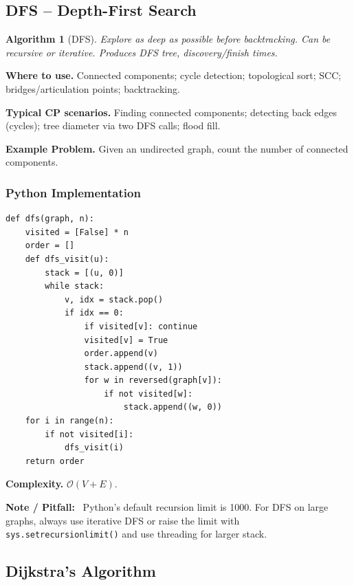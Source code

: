 \documentclass[10pt,a4paper]{article}
\theoremstyle{cpstyle}
\newtheorem{algorithm}[theorem]{Algorithm}
\newenvironment{cpnote}{%
  \begin{mdframed}[backgroundcolor=notebg, linecolor=orange!70, linewidth=1pt,
    innerleftmargin=10pt, innerrightmargin=10pt, innertopmargin=6pt, innerbottommargin=6pt]
  \textbf{\color{orange!80!black}Note / Pitfall:}~}{%
  \end{mdframed}}
\newcommand{\bigO}[1]{\mathcal{O}\!\left(#1\right)}
\begin{document}
\subsection{DFS -- Depth-First Search}

\begin{algorithm}[DFS]
Explore as deep as possible before backtracking. Can be recursive or iterative. Produces DFS tree, discovery/finish times.
\end{algorithm}

\textbf{Where to use.} Connected components; cycle detection; topological sort; SCC; bridges/articulation points; backtracking.

\textbf{Typical CP scenarios.} Finding connected components; detecting back edges (cycles); tree diameter via two DFS calls; flood fill.

\textbf{Example Problem.} Given an undirected graph, count the number of connected components.

\subsubsection{Python Implementation}
\begin{lstlisting}[caption={DFS -- iterative with timestamps}]
def dfs(graph, n):
    visited = [False] * n
    order = []
    def dfs_visit(u):
        stack = [(u, 0)]
        while stack:
            v, idx = stack.pop()
            if idx == 0:
                if visited[v]: continue
                visited[v] = True
                order.append(v)
                stack.append((v, 1))
                for w in reversed(graph[v]):
                    if not visited[w]:
                        stack.append((w, 0))
    for i in range(n):
        if not visited[i]:
            dfs_visit(i)
    return order
\end{lstlisting}

\textbf{Complexity.} $\bigO{V + E}$.

\begin{cpnote}
Python's default recursion limit is 1000. For DFS on large graphs, always use iterative DFS or raise the limit with \texttt{sys.setrecursionlimit()} and use threading for larger stack.
\end{cpnote}

\subsection{Dijkstra's Algorithm}
\end{document}
